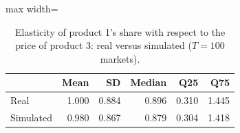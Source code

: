 \begin{table}[H]
\centering\small
\caption{Elasticity of product 1's share with respect to the price of product 3: real versus simulated ($T=100$ markets).}\label{tab:q8d_cell_13}
\begin{adjustbox}{max width=\linewidth}
\begin{tabular}{lrrrrr}
\toprule
 & Mean & SD & Median & Q25 & Q75 \\
\midrule
Real & 1.000 & 0.884 & 0.896 & 0.310 & 1.445 \\
Simulated & 0.980 & 0.867 & 0.879 & 0.304 & 1.418 \\
\bottomrule
\end{tabular}
\end{adjustbox}
\par\vspace{3pt}{\footnotesize Element $(1,3)$ of the elasticity matrix $\partial s_j/\partial p_k\cdot p_k/s_j$ across the 100 markets; simulated uses the Q8c estimates, real uses the true parameters.}
\end{table}
